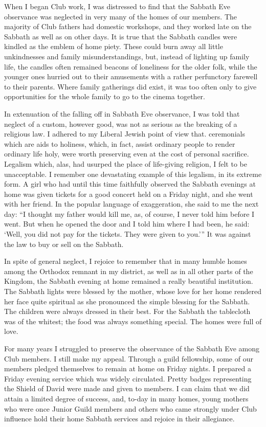 When I began Club work, I was distressed to find that
the Sabbath Eve observance was neglected in very many
of the homes of our members. The majority of Club
fathers had domestic workshops, and they worked late on
the Sabbath as well as on other days. It is true that the
Sabbath candles were kindled as the emblem of home
piety. These could burn away all little unkindnesses and
family misunderstandings, but, instead of lighting up
family life, the candles often remained beacons of loneliness
for the older folk, while the younger ones hurried
out to their amusements with a rather perfunctory farewell
to their parents. Where family gatherings did exist,
it was too often only to give opportunities for the whole
family to go to the cinema together.

In extenuation of the falling off in Sabbath Eve observance,
I was told that neglect of a custom, however good,
was not as serious as the breaking of a religious
law. I adhered to my Liberal Jewish point of view that.
ceremonials which are aids to holiness, which, in fact,
assist ordinary people to render ordinary life holy, were
worth preserving even at the cost of personal sacrifice.
Legalism which, alas, had usurped the place of life-giving
religion, I felt to be unacceptable. I remember one
devastating example of this legalism, in its extreme form.
A girl who had until this time faithfully observed the
Sabbath evenings at home was given tickets for a good
concert held on a Friday night, and she went with her
friend. In the popular language of exaggeration, she
said to me the next day: “I thought my father would
kill me, as, of course, I never told him before I went.
But when he opened the door and I told him where I
had been, he said: ‘Well, you did not pay for the tickets.
They were given to you.’” It was against the law to
buy or sell on the Sabbath.

In spite of general neglect, I rejoice to remember that
in many humble homes among the Orthodox remnant in
my district, as well as in all other parts of the Kingdom,
the Sabbath evening at home remained a really beautiful
institution. The Sabbath lights were blessed by the
mother, whose love for her home rendered her face quite
spiritual as she pronounced the simple blessing for the
Sabbath. The children were always dressed in their best.
For the Sabbath the tablecloth was of the whitest; the
food was always something special. The homes were full
of love.

For many years I struggled to preserve the observance
of the Sabbath Eve among Club members. I still make
my appeal. Through a guild fellowship, some of our
members pledged themselves to remain at home on
Friday nights. I prepared a Friday evening service which
was widely circulated. Pretty badges representing the
Shield of David were made and given to members. I can
claim that we did attain a limited degree of success, and,
to-day in many homes, young mothers who were once
Junior Guild members and others who came strongly
under Club influence hold their home Sabbath services
and rejoice in their allegiance.

